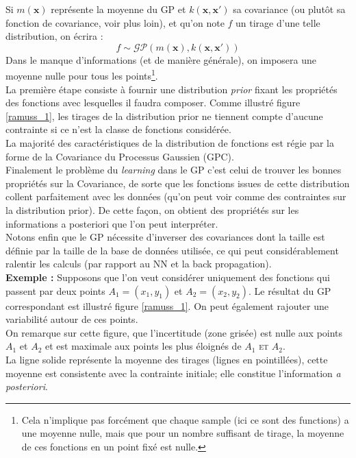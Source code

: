 \documentclass[a4paper,12pt]{report}
\newcommand{\bepar}[1]{
	\left( #1 \right)  
}
\newcommand\bk{\color{black}}
\newcommand{\dgreen}{\color{dgreen}}
\numberwithin{equation}{section} %
\begin{document}
Si $m(\textbf{x})$ représente la moyenne du GP et $k\bepar{\textbf{x}, \textbf{x}'}$ sa covariance (ou plutôt sa fonction de covariance, voir plus loin), et qu'on note $f$ un tirage d'une telle distribution, on écrira :
\begin{equation}
f \sim \mathcal{GP}\bepar{m(\textbf{x}), k\bepar{\textbf{x}, \textbf{x}'}}
\end{equation}
Dans le manque d'informations (et de manière générale), on imposera une moyenne nulle pour tous les points\footnote{Cela n'implique pas forcément que chaque sample (ici ce sont des functions) a une moyenne nulle, mais que pour un nombre suffisant de tirage, la moyenne de ces fonctions en un point fixé est nulle.}. \\ 
La première étape consiste à fournir une distribution \textit{prior} fixant les propriétés des fonctions avec lesquelles il faudra composer. Comme illustré figure \eqref{ramuss_1}, les tirages de la distribution prior ne tiennent compte d'aucune contrainte si ce n'est la classe de fonctions considérée. \\
La majorité des caractéristiques de la distribution de fonctions est régie par la forme de la Covariance du Processus Gaussien (GPC). \\

Finalement le problème du \textit{learning} dans le GP c'est celui de trouver les bonnes propriétés sur la Covariance, de sorte que les fonctions issues de cette distribution collent parfaitement avec les données (qu'on peut voir comme des contraintes sur la distribution prior). De cette façon, on obtient des propriétés sur les informations a posteriori que l'on peut interpréter. \\ Notons enfin que le GP nécessite d'inverser des covariances dont la taille est définie par la taille de la base de données utilisée, ce qui peut considérablement ralentir les calculs (par rapport au NN et la back propagation). \\[3mm]

\dgreen \textbf{\large{Exemple :}} \bk Supposons que l'on veut considérer uniquement des fonctions qui passent par deux points $A_1 = \left( x_1, y_1 \right)$ et $A_2 = \left( x_2, y_2\right)$. Le résultat du GP correspondant est illustré figure \eqref{ramuss_1}. On peut également rajouter une variabilité autour de ces points.\\
On remarque sur cette figure, que l'incertitude (zone grisée) est nulle aux points $A_1$ et $A_2$ et est maximale aux points les plus éloignés de $A_1$ \textsc{et} $A_2$.\\
La ligne solide représente la moyenne des tirages (lignes en pointillées), cette moyenne est consistente avec la contrainte initiale; elle constitue l'information \textit{a posteriori}.\\
\end{document}
